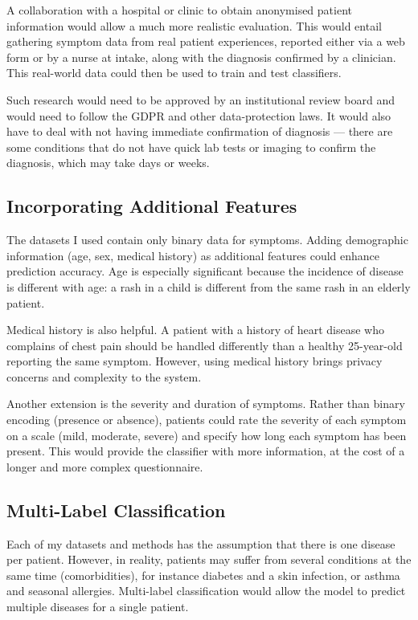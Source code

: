 A collaboration with a hospital or clinic to obtain anonymised patient information would allow a much more realistic evaluation. This would entail gathering symptom data from real patient experiences, reported either via a web form or by a nurse at intake, along with the diagnosis confirmed by a clinician. This real-world data could then be used to train and test classifiers.

Such research would need to be approved by an institutional review board and would need to follow the GDPR and other data-protection laws. It would also have to deal with not having immediate confirmation of diagnosis --- there are some conditions that do not have quick lab tests or imaging to confirm the diagnosis, which may take days or weeks.

\subsection{Incorporating Additional Features}

The datasets I used contain only binary data for symptoms. Adding demographic information (age, sex, medical history) as additional features could enhance prediction accuracy. Age is especially significant because the incidence of disease is different with age: a rash in a child is different from the same rash in an elderly patient.

Medical history is also helpful. A patient with a history of heart disease who complains of chest pain should be handled differently than a healthy 25-year-old reporting the same symptom. However, using medical history brings privacy concerns and complexity to the system.

Another extension is the severity and duration of symptoms. Rather than binary encoding (presence or absence), patients could rate the severity of each symptom on a scale (mild, moderate, severe) and specify how long each symptom has been present. This would provide the classifier with more information, at the cost of a longer and more complex questionnaire.

\subsection{Multi-Label Classification}

Each of my datasets and methods has the assumption that there is one disease per patient. However, in reality, patients may suffer from several conditions at the same time (comorbidities), for instance diabetes and a skin infection, or asthma and seasonal allergies. Multi-label classification would allow the model to predict multiple diseases for a single patient.

